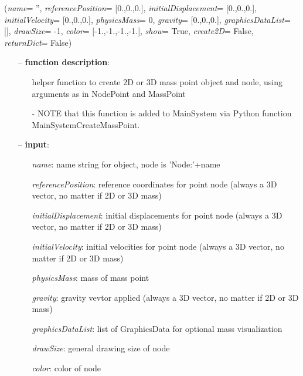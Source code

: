 \begin{flushleft}
\label{sec:mainsystemextensions:CreateMassPoint}
({\it name}= '', {\it referencePosition}= [0.,0.,0.], {\it initialDisplacement}= [0.,0.,0.], {\it initialVelocity}= [0.,0.,0.], {\it physicsMass}= 0, {\it gravity}= [0.,0.,0.], {\it graphicsDataList}= [], {\it drawSize}= -1, {\it color}= [-1.,-1.,-1.,-1.], {\it show}= True, {\it create2D}= False, {\it returnDict}= False)
\end{flushleft}
\setlength{\itemindent}{0.7cm}
\begin{itemize}[leftmargin=0.7cm]
\item[--]
{\bf function description}: \vspace{-6pt}
\begin{itemize}[leftmargin=1.2cm]
\setlength{\itemindent}{-0.7cm}
\item[]helper function to create 2D or 3D mass point object and node, using arguments as in NodePoint and MassPoint
\item[]- NOTE that this function is added to MainSystem via Python function MainSystemCreateMassPoint.
\end{itemize}
\item[--]
{\bf input}: \vspace{-6pt}
\begin{itemize}[leftmargin=1.2cm]
\setlength{\itemindent}{-0.7cm}
\item[]{\it name}: name string for object, node is 'Node:'+name
\item[]{\it referencePosition}: reference coordinates for point node (always a 3D vector, no matter if 2D or 3D mass)
\item[]{\it initialDisplacement}: initial displacements for point node (always a 3D vector, no matter if 2D or 3D mass)
\item[]{\it initialVelocity}: initial velocities for point node (always a 3D vector, no matter if 2D or 3D mass)
\item[]{\it physicsMass}: mass of mass point
\item[]{\it gravity}: gravity vevtor applied (always a 3D vector, no matter if 2D or 3D mass)
\item[]{\it graphicsDataList}: list of GraphicsData for optional mass visualization
\item[]{\it drawSize}: general drawing size of node
\item[]{\it color}: color of node

\end{itemize}
\end{itemize}
